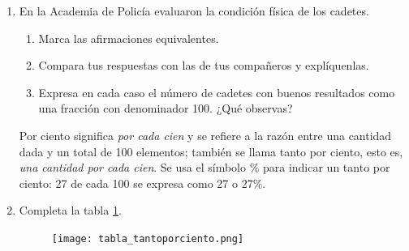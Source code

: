 \documentclass[11pt]{book}
\begin{document}
\begin{enumerate}
  \item En la Academia de Policía evaluaron la condición física de los cadetes.
        \begin{enumerate}
          \item Marca las afirmaciones equivalentes.\\
          \item Compara tus respuestas con las de tus compañeros y explíquenlas.
          \item Expresa en cada caso el número de cadetes con buenos resultados como una fracción
                con denominador 100. ¿Qué observas?
        \end{enumerate}

        \begin{boxH}
          Por ciento significa \emph{por cada cien} y se refiere a la razón entre una cantidad dada
          y un total de 100 elementos; también se llama tanto por ciento, esto es, \emph{una cantidad por cada cien}.
          Se usa el símbolo \% para indicar un tanto por ciento: 27 de
          cada 100 se expresa como 27 o 27\%.
        \end{boxH}

  \item Completa la tabla \ref{fig:tabla_tantoporciento}.

        \begin{figure}[H]
          \centering
          \texttt{[image: tabla\_tantoporciento.png]}
          \label{fig:tabla_tantoporciento}
        \end{figure}


\end{enumerate}
\end{document}
